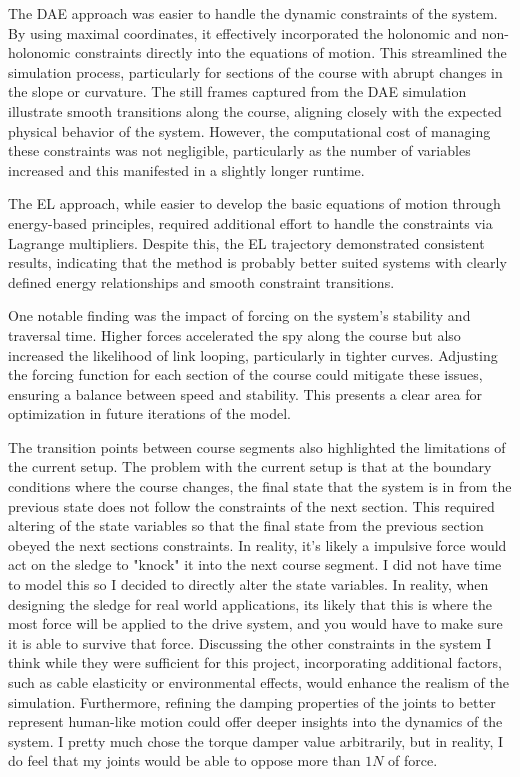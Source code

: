 \documentclass{article}
\begin{document}
The DAE approach was easier to handle the dynamic constraints of the system. By using maximal coordinates, it effectively incorporated the holonomic and non-holonomic constraints directly into the equations of motion. This streamlined the simulation process, particularly for sections of the course with abrupt changes in the slope or curvature. The still frames captured from the DAE simulation illustrate smooth transitions along the course, aligning closely with the expected physical behavior of the system. However, the computational cost of managing these constraints was not negligible, particularly as the number of variables increased and this manifested in a slightly longer runtime.

The EL approach, while easier to develop the basic equations of motion through energy-based principles, required additional effort to handle the constraints via Lagrange multipliers. Despite this, the EL trajectory demonstrated consistent results, indicating that the method is probably better suited systems with clearly defined energy relationships and smooth constraint transitions.

One notable finding was the impact of forcing on the system’s stability and traversal time. Higher forces accelerated the spy along the course but also increased the likelihood of link looping, particularly in tighter curves. Adjusting the forcing function for each section of the course could mitigate these issues, ensuring a balance between speed and stability. This presents a clear area for optimization in future iterations of the model.

The transition points between course segments also highlighted the limitations of the current setup. The problem with the current setup is that at the boundary conditions where the course changes, the final state that the system is in from the previous state does not follow the constraints of the next section. This required altering of the state variables so that the final state from the previous section obeyed the next sections constraints. In reality, it's likely a impulsive force would act on the sledge to "knock" it into the next course segment. I did not have time to model this so I decided to directly alter the state variables. In reality, when designing the sledge for real world applications, its likely that this is where the most force will be applied to the drive system, and you would have to make sure it is able to survive that force. Discussing the other constraints in the system I think while they were sufficient for this project, incorporating additional factors, such as cable elasticity or environmental effects, would enhance the realism of the simulation. Furthermore, refining the damping properties of the joints to better represent human-like motion could offer deeper insights into the dynamics of the system. I pretty much chose the torque damper value arbitrarily, but in reality, I do feel that my joints would be able to oppose more than $1N$ of force. 
\end{document}
